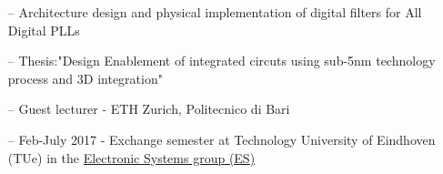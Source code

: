 \documentclass[10pt,a4paper,fancychapters]{altacv}
\begin{document}


\begin{itemize}
    \setlength{\itemindent}{0.5em}
    \item[--]  \small {Architecture design and physical implementation of digital filters for All Digital PLLs}
    
\end{itemize}




\begin{itemize}
    \setlength{\itemindent}{0.5em}
    \item[--] \small{Thesis:"Design Enablement of integrated circuts using sub-5nm technology process and 3D integration"}
    \item[--] \small{Guest lecturer - ETH Zurich, Politecnico di Bari} 
\end{itemize}
\medskip




\medskip

\begin{itemize}
    \setlength{\itemindent}{0.5em}
    \item[--] \small{Feb-July 2017 - Exchange semester at Technology University of Eindhoven (TUe) in the
    \href{https://research.tue.nl/en/organisations/electronic-systems}{Electronic Systems group (ES)}}
\end{itemize}
\end{document}
